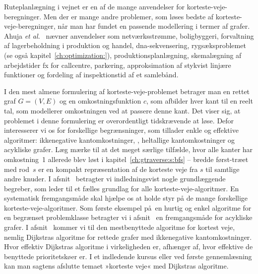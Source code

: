 Ruteplanlægning
i vejnet er en af de mange anvendelser for korteste-veje-beregninger.
Men der er mange andre problemer, som løses bedste af korteste-veje-beregninger, når man har fundet en passende modellering i termer af grafer.
Ahuja \emph{et al.}~\cite{AhuMagOrl93} nævner anvendelser som netværksstrømme, boligbyggeri, forvaltning af lagerbeholdning i produktion og handel, 
dna-sekvensering, rygsæksproblemet 
(se også kapitel~\ref{ch:optimization:}), produktionsplanlægning, skemalægning af arbejdstider fx for callcentre,
parkering, approksimation af stykvist linjære funktioner og fordeling af inspektionstid af et samlebånd.

I den mest almene formulering af korteste-veje-problemet betrager man en rettet graf $G=(V,E)$ og en omkostningsfunktion $c$, som afbilder hver kant til en reelt tal, som modellerer omkostningen ved at passere denne kant. 
Det viser sig, at problemet i denne formulering er overordentligt tidskrævende at løse.
Defor interesserer vi os for forskellige begrænsninger, som tillader enkle og effektive algoritmer: 
ikkenegative kantomkostninger,
, 
heltallige kantomkostninger
og acykliske grafer.
Læg mærke til at det meget særlige tilfælde, hvor alle kanter har omkostning~1
allerede blev løst i kapitel~\ref{ch:gtraverse:s:bfs} -- bredde først-træet med rod~$s$  er en kompakt repræsentation af de korteste veje fra $s$ til samtlige andre knuder. 
I afsnit~ betragter vi indledningsvist nogle grundlæggende begreber, som leder til et fælles grundlag for alle korteste-veje-algoritmer. 
En systematisk fremgangsmåde skal hjælpe os at holde styr på de mange forskellige korteste-veje-algoritmer.
Som første eksempel på en hurtig og enkel algoritme for en begrænset problemklasse betragter vi i afsnit~ en fremgangsmåde for acykliske grafer.
I afsnit~ kommer vi til den mestbenyttede algoritme for kortest veje, nemlig Dijkstras algoritme for rettede grafer med ikkenegative kantomkostninger.
Hvor effektiv Dijkstras algoritme i virkeligheden er, afhænger af, hvor effektive de benyttede prioritetskøer er.
I et indledende kursus eller ved første gennemlæsning kan man sagtens afslutte temaet »korteste veje« med Dijkstras algoritme.
